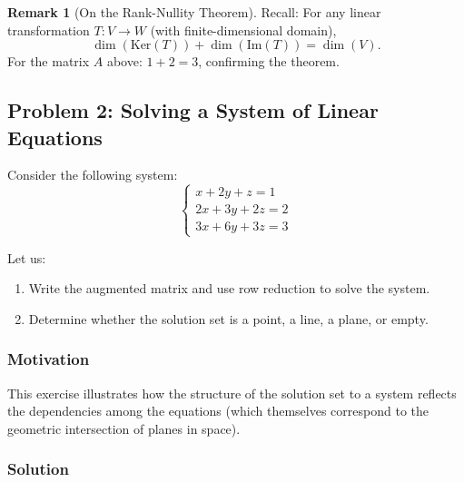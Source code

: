 \documentclass[12pt]{article}
\theoremstyle{definition}
\newtheorem{remark}{Remark}[section]
\theoremstyle{plain}
\begin{document}
\begin{remark}[On the Rank-Nullity Theorem]
    Recall: For any linear transformation \( T: V \to W \) (with finite-dimensional domain), \[
    \dim(\mathrm{Ker}(T)) + \dim(\mathrm{Im}(T)) = \dim(V).
    \]
    For the matrix \( A \) above: \( 1 + 2 = 3 \), confirming the theorem.
\end{remark}

\subsection{Problem 2: Solving a System of Linear Equations}

Consider the following system:
\[
\begin{cases}
x + 2y + z = 1 \\
2x + 3y + 2z = 2 \\
3x + 6y + 3z = 3
\end{cases}
\]

Let us:

\begin{enumerate}[label=(\alph*)]
    \item Write the augmented matrix and use row reduction to solve the system.
    \item Determine whether the solution set is a point, a line, a plane, or empty.
\end{enumerate}

\subsubsection*{Motivation}

This exercise illustrates how the structure of the solution set to a system reflects the dependencies among the equations (which themselves correspond to the geometric intersection of planes in space).

\subsubsection*{Solution}
\end{document}

